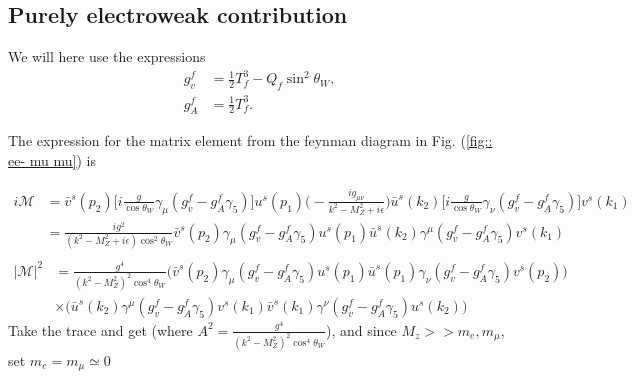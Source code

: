 \documentclass[11pt]{article}
\begin{document}
\subsection{Purely electroweak contribution} 
\begin{flushleft}
We will here use the expressions
\begin{align}
g_v^f &= \frac{1}{2} T_f^3 - Q_f \sin^2 \theta_W,\\
g_A^f &= \frac{1}{2} T_f^3.
\end{align}
\end{flushleft}

\begin{center}
The expression for the matrix element from the feynman diagram in Fig. (\ref{fig:: ee- mu mu}) is
\end{center}
\begin{align*}
i\mathcal{M} &= \bar{v}^s(p_2) \big[i \frac{g}{\cos \theta_W} \gamma_{\mu} (g_v^f - g_A^f \gamma_5)\big] u^s(p_1) \Big(- \frac{ig_{\mu \nu}}{k^2 - M_Z^2 + i \epsilon} \Big) \bar{u}^s (k_2) \big[i \frac{g}{\cos \theta_W} \gamma_{\nu} (g_v^f - g_A^f \gamma_5)\big] v^s (k_1)\\
&= 
\frac{i g^2}{(k^2 - M_Z^2 + i \epsilon)\cos^2 \theta_W} 
\bar{v}^s(p_2) \gamma_{\mu} (g_v^f - g_A^f \gamma_5) u^s(p_1)  \bar{u}^s (k_2) \gamma^{\mu} (g_v^f - g_A^f \gamma_5) v^s (k_1)\\
\end{align*}
\begin{align*}
|\mathcal{M}|^2 &= \frac{g^4}{(k^2 - M_Z^2)^2\cos^4 \theta_W} 
\Big( \bar{v}^s(p_2) \gamma_{\mu} (g_v^f - g_A^f \gamma_5) u^s(p_1) 
\bar{u}^s(p_1) \gamma_{\nu} (g_v^f - g_A^f \gamma_5) v^s(p_2) 
\Big)\\
& \times
\Big(
 \bar{u}^s (k_2) \gamma^{\mu} (g_v^f - g_A^f \gamma_5) v^s (k_1)
\bar{v}^s (k_1) \gamma^{\nu} (g_v^f - g_A^f \gamma_5) u^s (k_2) 
  \Big)
\end{align*}
Take the trace and get (where $A^2 = \frac{g^4}{(k^2 - M_Z^2)^2\cos^4 \theta_W} $), and since $M_z >> m_e, m_{\mu}$, set $m_e = m_{\mu} \simeq 0$
\end{document}
